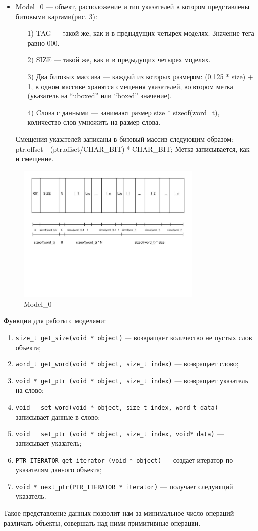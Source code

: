 \begin{itemize}
\item Model\_0 — объект, расположение и тип указателей в котором представлены битовыми картами(рис. 3):
\begin{enumerate}
\item[1)] TAG — такой же, как и в предыдущих четырех моделях. Значение тега равно 000.
\item[2)] SIZE — такой же, как и в предыдущих четырех моделях.
\item[3)] Два битовых массива —  каждый из которых размером: (0.125 * size) + 1, в одном массиве хранятся смещения указателей, во втором метка (указатель на ``uboxed'' или ``boxed''  значение).
\item[4)] Cлова с данными — занимают размер size * sizeof(word\_t), количество слов умножить на размер слова.
\end{enumerate}
Смещения указателей записаны в битовый массив следующим образом: ptr.offset - (ptr.offset/CHAR\_BIT) * CHAR\_BIT;
Метка записывается, как и смещение.
\end{itemize}
\begin{figure}[h]
\includegraphics[width=0.8\textwidth]{Kren/3}
\caption{Model\_0}
\end{figure}

Функции для работы с моделями:
\begin{enumerate}
\item \lstinline{size_t get_size(void * object)} — возвращает количество не пустых слов объекта; 
\item \lstinline{word_t get_word(void * object, size_t index)} — возвращает слово;
\item \lstinline{void * get_ptr (void * object, size_t index)} — возвращает указатель на слово;
\item \lstinline{void   set_word(void * object, size_t index, word_t data)}  — записывает данные в слово;
\item \lstinline{void   set_ptr (void * object, size_t index, void* data)}   — записывает указатель;
\item \lstinline{PTR_ITERATOR get_iterator (void * object)} — создает итератор по указателям данного объекта;
\item \lstinline{void * next_ptr(PTR_ITERATOR * iterator)} — получает следующий указатель.
\end{enumerate}
Такое представление данных позволит нам за минимальное число операций различать объекты, совершать над ними примитивные операции.


